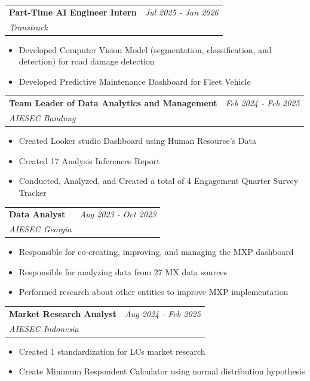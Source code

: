 \documentclass[a4paper,11pt]{article}
\makeatletter
\newcommand{\resumeSubheading}[4]{
\vspace{0.5mm}\item
    \begin{tabular*}{0.98\textwidth}[t]{l@{\extracolsep{\fill}}r}
        \textbf{#1} & \textit{\footnotesize{#4}} \\
        \textit{\footnotesize{#3}} &  \footnotesize{#2}\\
    \end{tabular*}
    \vspace{-2.4mm}
}
\newcommand{\resumeItemListStart}{\begin{justify}\begin{itemize}[leftmargin=3ex, rightmargin=2ex, noitemsep,labelsep=1.2mm,itemsep=0mm]\small}
\newcommand{\resumeItemListEnd}{\end{itemize}\end{justify}\vspace{-2mm}}
\makeatother
\begin{document}
    \resumeSubheading
      {Part-Time AI Engineer Intern}{}
      {Transtrack}{Jul 2025 - Jan 2026}
      \vspace{-2.0mm}
      
      \resumeItemListStart
    \item {Developed Computer Vision Model (segmentation, classification, and detection) for road damage detection}
    \item {Developed Predictive Maintenance Dashboard for Fleet Vehicle}
    \resumeItemListEnd
\vspace{-3.0mm}

    \resumeSubheading
      {Team Leader of Data Analytics and Management}{}
      {AIESEC Bandung}{Feb 2024 - Feb 2025}
      \vspace{-2.0mm}
      
      \resumeItemListStart
    \item {Created Looker studio Dashboard using Human Resource's Data}
    \item {Created 17 Analysis Inferences Report}
    \item {Conducted, Analyzed, and Created a total of 4 Engagement Quarter Survey Tracker}
    \resumeItemListEnd
    
    \vspace{-3.0mm}

    \resumeSubheading
      {Data Analyst}{}
      {AIESEC Georgia}{Aug 2023 - Oct 2023}
      \vspace{-2.0mm}
      
      \resumeItemListStart
    \item {Responsible for co-creating, improving, and managing the MXP dashboard}
    \item {Responsible for analyzing data from 27 MX data sources}
    \item {Performed research about other entities to improve MXP implementation}
    \resumeItemListEnd
    
    \vspace{-3.0mm}

    \resumeSubheading
      {Market Research Analyst}{}
      {AIESEC Indonesia}{Aug 2024 - Feb 2025}
      \vspace{-2.0mm}
      
      \resumeItemListStart
    \item {Created 1 standardization for LCs market research}
    \item {Create Minimum Respondent Calculator using normal distribution hypothesis}
    \resumeItemListEnd
    
\end{document}
